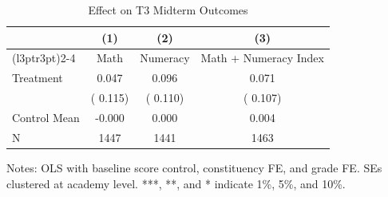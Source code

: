 \begin{table}[!htbp]
\centering
\caption{Effect on T3 Midterm Outcomes}
\label{tab:ng_t3_mte}
\begin{threeparttable}
\begin{tabular}[t]{lccc}
\toprule
 & (1) & (2) & (3) \\
\cmidrule(l{3pt}r{3pt}){2-4}
 & Math & Numeracy & Math + Numeracy Index \\
\midrule
Treatment &   0.047 &   0.096 &   0.071 \\
 & (  0.115) & (  0.110) & (  0.107) \\
\addlinespace
Control Mean &  -0.000 &   0.000 &   0.004 \\
N & 1447 & 1441 & 1463 \\
\bottomrule
\end{tabular}
\begin{tablenotes}[para]
\item Notes: OLS with baseline score control, constituency FE, and grade FE. 
SEs clustered at academy level. ***, **, and * indicate 1\%, 5\%, and 10\%.
\end{tablenotes}
\end{threeparttable}
\end{table}
